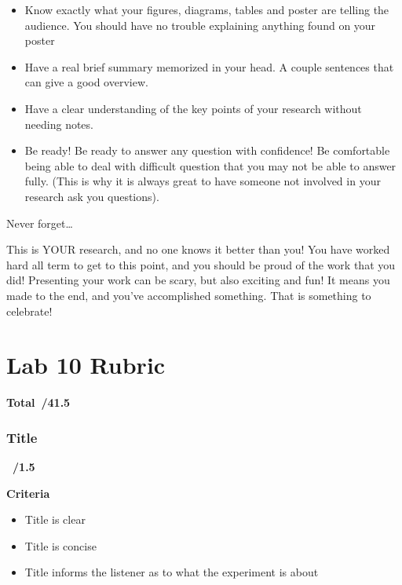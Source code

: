 \documentclass[
]{book}
\providecommand{\tightlist}{%
  \setlength{\itemsep}{0pt}\setlength{\parskip}{0pt}}
\begin{document}
\begin{itemize}
\tightlist
\item
  Know exactly what your figures, diagrams, tables and poster are telling the audience. You should have no trouble explaining anything found on your poster
\item
  Have a real brief summary memorized in your head. A couple sentences that can give a good overview.
\item
  Have a clear understanding of the key points of your research without needing notes.
\item
  Be ready! Be ready to answer any question with confidence! Be comfortable being able to deal with difficult question that you may not be able to answer fully. (This is why it is always great to have someone not involved in your research ask you questions).
\end{itemize}

Never forget\ldots{}

This is YOUR research, and no one knows it better than you! You have worked hard all term to get to this point, and you should be proud of the work that you did! Presenting your work can be scary, but also exciting and fun! It means you made to the end, and you've accomplished something. That is something to celebrate!

\hypertarget{lab-10-rubric}{%
\chapter*{Lab 10 Rubric}\label{lab-10-rubric}}

\textbf{Total~/41.5}

\hypertarget{title}{%
\subsection*{Title}\label{title}}

\textbf{~/1.5}

\textbf{Criteria}

\begin{itemize}
\tightlist
\item
  Title is clear
\item
  Title is concise
\item
  Title informs the listener as to what the experiment is about
\end{itemize}
\end{document}
